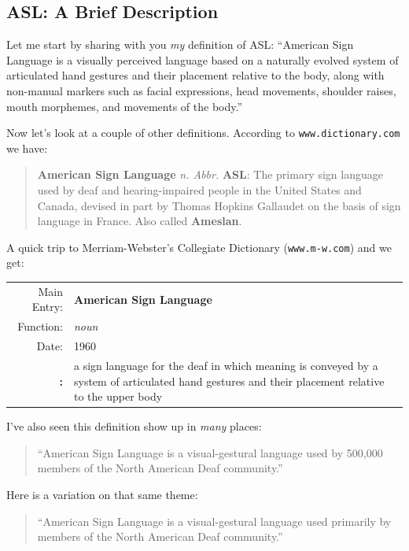 \documentclass{article}
\begin{document}
\subsection{ASL: A Brief Description}

Let me start by sharing with you \emph{my} definition of ASL:
``American Sign Language is a visually perceived language based on a naturally evolved system of articulated hand gestures and their placement relative to the body, along with non-manual markers such as facial expressions, head movements, shoulder raises, mouth morphemes, and movements of the body.''

Now let's look at a couple of other definitions.
According to \texttt{www.dictionary.com} we have:

\begin{quote}
\textbf{American Sign Language} \textit{n. Abbr.} \textbf{ASL}:
The primary sign language used by deaf and hearing-impaired people in the United States and Canada, devised in part by Thomas Hopkins Gallaudet on the basis of sign language in France.
Also called \textbf{Ameslan}.
\end{quote}

A quick trip to Merriam-Webster's Collegiate Dictionary (\texttt{www.m-w.com}) and we get:

\begin{tabular}{rp{10cm}}
Main Entry:&\textbf{American Sign Language}\\
Function:&\emph{noun}\\
Date:&1960\\
\textbf{:}&a sign language for the deaf in which meaning is conveyed by a system of articulated hand gestures and their placement relative to the upper body\\
\end{tabular}

I've also seen this definition show up in \emph{many} places:

\begin{quote}
``American Sign Language is a visual-gestural language used by 500,000 members of the North American Deaf community.''
\end{quote}

Here is a variation on that same theme:

\begin{quote}
``American Sign Language is a visual-gestural language used primarily by members of the North American Deaf community.''
\end{quote}
\end{document}
